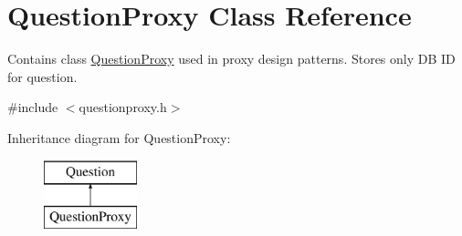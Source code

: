 \hypertarget{class_question_proxy}{}\section{Question\+Proxy Class Reference}
\label{class_question_proxy}


Contains class \hyperlink{class_question_proxy}{Question\+Proxy} used in proxy design patterns. Stores only DB ID for question.  




{\ttfamily \#include $<$questionproxy.\+h$>$}

Inheritance diagram for Question\+Proxy\+:\begin{figure}[H]
\begin{center}
\leavevmode
\includegraphics[height=2.000000cm]{class_question_proxy}
\end{center}
\end{figure}
